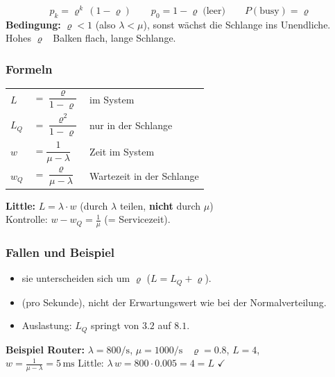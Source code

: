 \smallskip
$$ \boxed{ p_k = \varrho^k\,(1-\varrho) } \qquad p_0 = 1-\varrho \;\text{(leer)} \qquad P(\text{busy}) = \varrho $$
\textbf{Bedingung:} $\varrho < 1$ (also $\lambda < \mu$), sonst wächst die Schlange ins Unendliche. Hohes $\varrho$ \textrightarrow\ Balken flach, lange Schlange.

\subsubsection{Formeln}

\renewcommand{\arraystretch}{2.2}
\begin{tabular}{lll}
	$L$ & $= \dfrac{\varrho}{1-\varrho}$ & im System \\
	$L_Q$ & $= \dfrac{\varrho^2}{1-\varrho}$ & nur in der Schlange \\
	$w$ & $= \dfrac{1}{\mu-\lambda}$ & Zeit im System \\
	$w_Q$ & $= \dfrac{\varrho}{\mu-\lambda}$ & Wartezeit in der Schlange \\
\end{tabular}
\renewcommand{\arraystretch}{1}

\smallskip
\textbf{Little:} \; $\boxed{L = \lambda \cdot w}$ \quad (durch $\lambda$ teilen, \textbf{nicht} durch $\mu$) \\
Kontrolle: $w - w_Q = \frac{1}{\mu}$ (= Servicezeit).

\medskip
{}

\subsubsection{Fallen und Beispiel}

\begin{itemize}
	\item {} sie unterscheiden sich um $\varrho$ ($L = L_Q + \varrho$).
	\item {} (pro Sekunde), nicht der Erwartungswert wie bei der Normalverteilung.
	\item {} Auslastung: $L_Q$ springt von $3.2$ auf $8.1$.
\end{itemize}

\textbf{Beispiel Router:} $\lambda = 800/\text{s}$, $\mu = 1000/\text{s}$ \textrightarrow\ $\varrho = 0.8$, $L = 4$, \\
$w = \frac{1}{\mu-\lambda} = 5\,\text{ms}$ \quad Little: $\lambda\, w = 800 \cdot 0.005 = 4 = L$ $\checkmark$
